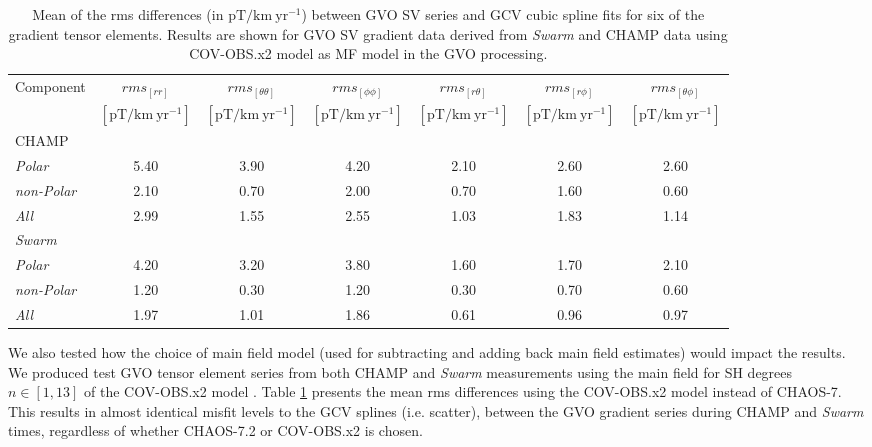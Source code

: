\documentclass[extra,mreferee]{gji}
\begin{document}
\begin{table}
\caption{Mean of the rms differences (in $\mathrm{pT/km \: yr^{-1}}$) between GVO SV series and GCV cubic spline fits for six of the gradient tensor elements. Results are shown for GVO SV gradient data derived from \textit{Swarm} and CHAMP data using COV-OBS.x2 model \citep{Huder_etal_2020} as MF model in the GVO processing.}
\centering
{\small
\begin{tabular}{l | c c c c c c}
\hline
 Component          & $rms_{[rr]}$& $rms_{[\theta \theta]}$& $rms_{[\phi \phi]}$& $rms_{[r \theta]}$& $rms_{[r \phi]}$& $rms_{[\theta \phi]}$  \\
                    & $[\mathrm{pT}/\mathrm{km} \: \mathrm{yr}^{-1}]$& $[\mathrm{pT}/\mathrm{km} \: \mathrm{yr}^{-1}]$  & $[\mathrm{pT}/\mathrm{km} \: \mathrm{yr}^{-1}]$ & $[\mathrm{pT}/\mathrm{km} \: \mathrm{yr}^{-1}]$ & $[\mathrm{pT}/\mathrm{km} \: \mathrm{yr}^{-1}]$ & $[\mathrm{pT}/\mathrm{km} \: \mathrm{yr}^{-1}]$    \\
\hline                             
CHAMP                &          &          &          &          &          &         \\ 
\textit{Polar}     &     5.40 &     3.90 &     4.20 &     2.10 &     2.60 &     2.60 \\ 
\textit{non-Polar} &     2.10 &     0.70 &     2.00 &     0.70 &     1.60 &     0.60 \\ 
\textit{All}       &     2.99 &     1.55 &     2.55 &     1.03 &     1.83 &     1.14 \\ 
\hline          
\textit{Swarm}      &          &          &          &          &          &         \\ 
\textit{Polar}     &     4.20 &     3.20 &     3.80 &     1.60 &     1.70 &     2.10 \\ 
\textit{non-Polar} &     1.20 &     0.30 &     1.20 &     0.30 &     0.70 &     0.60 \\ 
\textit{All}       &     1.97 &     1.01 &     1.86 &     0.61 &     0.96 &     0.97 \\ 
\hline  
\end{tabular}
\label{table:1b}}
\end{table} 

We also tested how the choice of main field model (used for subtracting and adding back main field estimates) would impact the results. We produced test GVO tensor element series from both CHAMP and {\it Swarm} measurements using the main field  for SH degrees $n \in [1,13]$ of the COV-OBS.x2 model \citep{Huder_etal_2020}. Table \ref{table:1b} presents the mean rms differences using the COV-OBS.x2 model instead of CHAOS-7. This results in almost identical misfit levels to the GCV splines (i.e. scatter), between the GVO gradient series during CHAMP and {\it Swarm} times, regardless of whether CHAOS-7.2 or COV-OBS.x2 is chosen.
\end{document}
